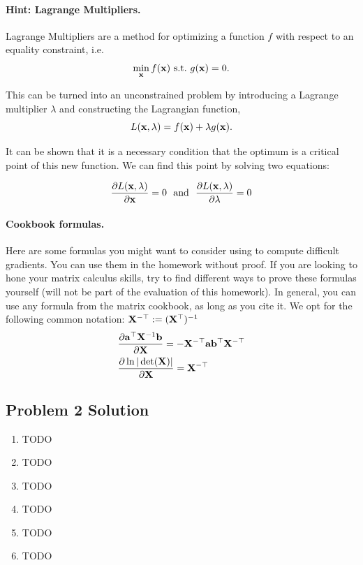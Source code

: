 \documentclass[submit]{harvardml}
\begin{document}
\begin{problem}
\paragraph{Hint: Lagrange Multipliers.} Lagrange Multipliers are a method for
optimizing a function $f$ with respect to an
equality constraint, i.e.
\[\min_{\mathbf{x}} f(\mathbf{x})\ \text{s.t.}\ g(\mathbf{x}) = 0.\]

This can be turned into an unconstrained problem by introducing a
Lagrange multiplier $\lambda$ and constructing the Lagrangian function,
\[L(\mathbf{x}, \lambda) =  f(\mathbf{x}) + \lambda g(\mathbf{x}).\]

It can be shown that it is a necessary condition that the optimum
is a critical point of this new function. We can find this point by solving two equations:

\[\frac{\partial L(\mathbf{x}, \lambda)}{\partial  \mathbf{x}} = 0  \ \ \text{and}\  \  \frac{\partial L(\mathbf{x}, \lambda)}{\partial \lambda} = 0 \]


\paragraph{Cookbook formulas.} Here are some formulas you might want to consider
using to compute difficult gradients. You can use them  in the homework
without proof. If you are looking to hone your matrix calculus skills, try to
find different ways to prove these formulas yourself (will not be part of the
evaluation of this homework). In general, you can use any formula from the matrix cookbook,
as long as you cite it. We opt for the following common notation:
$\mathbf{X}^{-\top} := (\mathbf{X}^{\top})^{-1}$
\begin{align*}
  & \frac{\partial \mathbf{a}^\top \mathbf{X}^{-1} \mathbf{b}}{\partial \mathbf{X}} = - \mathbf{X}^{-\top} \mathbf{a} \mathbf{b}^\top \mathbf{X}^{-\top} \\
  & \frac{\partial \ln | \det (\mathbf{X}) |}{\partial \mathbf{X}} = \mathbf{X}^{-\top}
 \end{align*}
 \end{problem}

\newpage

\color{blue}
\subsection*{Problem 2 Solution}
\begin{enumerate}
    \item TODO
    \item TODO
    \item TODO
    \item TODO 
    \item TODO 
    \item TODO 
\end{enumerate}
\color{black}
\end{document}
